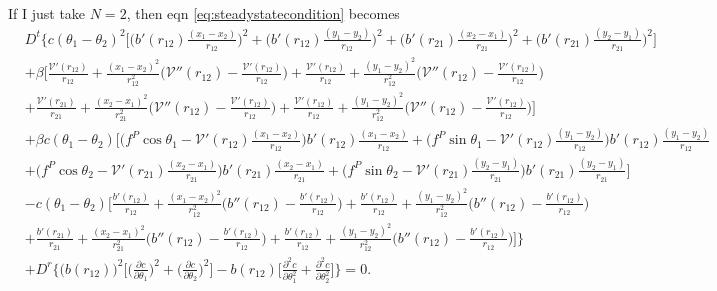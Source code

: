 \documentclass{article}
\begin{document}
If I just take $N=2$, then eqn \ref{eq:steadystatecondition} becomes
\begin{align}
  &D^t\bigg\{c(\theta_1-\theta_2)^2\bigg[\bigg(b'(r_{12})\frac{(x_1-x_2)}{r_{12}}\bigg)^2
    +\bigg(b'(r_{12})\frac{(y_1-y_2)}{r_{12}}\bigg)^2
    +\bigg(b'(r_{21})\frac{(x_2-x_1)}{r_{21}}\bigg)^2
    +\bigg(b'(r_{21})\frac{(y_2-y_1)}{r_{21}}\bigg)^2\bigg]\nonumber\\
  &+\beta\bigg[\frac{\mathcal{V}'(r_{12})}{r_{12}}
    +\frac{(x_1-x_2)^2}{r_{12}^2}\bigg(\mathcal{V}''(r_{12})
    -\frac{\mathcal{V}'(r_{12})}{r_{12}}\bigg)
    +\frac{\mathcal{V}'(r_{12})}{r_{12}}
    +\frac{(y_1-y_2)^2}{r_{12}^2}\bigg(\mathcal{V}''(r_{12})
    -\frac{\mathcal{V}'(r_{12})}{r_{12}}\bigg)\nonumber\\
  &+\frac{\mathcal{V}'(r_{21})}{r_{21}}
    +\frac{(x_2-x_1)^2}{r_{21}^2}\bigg(\mathcal{V}''(r_{12})
    -\frac{\mathcal{V}'(r_{12})}{r_{12}}\bigg)
    +\frac{\mathcal{V}'(r_{12})}{r_{12}}
    +\frac{(y_1-y_2)^2}{r_{12}^2}\bigg(\mathcal{V}''(r_{12})
    -\frac{\mathcal{V}'(r_{12})}{r_{12}}\bigg)\bigg]\nonumber\\
  &+\beta c(\theta_1-\theta_2)\bigg[
    \bigg(f^P\cos\theta_1-\mathcal{V}'(r_{12})\frac{(x_1-x_2)}{r_{12}}\bigg)
    b'(r_{12})\frac{(x_1-x_2)}{r_{12}}
    +\bigg(f^P\sin\theta_1-\mathcal{V}'(r_{12})\frac{(y_1-y_2)}{r_{12}}\bigg)
    b'(r_{12})\frac{(y_1-y_2)}{r_{12}}\nonumber\\
  &+\bigg(f^P\cos\theta_2-\mathcal{V}'(r_{21})\frac{(x_2-x_1)}{r_{21}}\bigg)
    b'(r_{21})\frac{(x_2-x_1)}{r_{21}}
    +\bigg(f^P\sin\theta_2-\mathcal{V}'(r_{21})\frac{(y_2-y_1)}{r_{21}}\bigg)
    b'(r_{21})\frac{(y_2-y_1)}{r_{21}}\bigg]\nonumber\\
  &-c(\theta_1-\theta_2)\bigg[\frac{b'(r_{12})}{r_{12}}
    +\frac{(x_1-x_2)^2}{r_{12}^2}\bigg(b''(r_{12})
    -\frac{b'(r_{12})}{r_{12}}\bigg)
    +\frac{b'(r_{12})}{r_{12}}
    +\frac{(y_1-y_2)^2}{r_{12}^2}\bigg(b''(r_{12})
    -\frac{b'(r_{12})}{r_{12}}\bigg)\nonumber\\
  &+\frac{b'(r_{21})}{r_{21}}
    +\frac{(x_2-x_1)^2}{r_{21}^2}\bigg(b''(r_{12})
    -\frac{b'(r_{12})}{r_{12}}\bigg)
    +\frac{b'(r_{12})}{r_{12}}
    +\frac{(y_1-y_2)^2}{r_{12}^2}\bigg(b''(r_{12})
    -\frac{b'(r_{12})}{r_{12}}\bigg)\bigg]\bigg\}\nonumber\\
  &+D^r\bigg\{\big(b(r_{12})\big)^2\bigg[\bigg(\frac{\partial c}{\partial \theta_1}\bigg)^2
    +\bigg(\frac{\partial c}{\partial \theta_2}\bigg)^2\bigg]
    -b(r_{12})\bigg[\frac{\partial^2 c}{\partial \theta_1^2}
    +\frac{\partial^2 c}{\partial \theta_2^2}\bigg]\bigg\}=0.
\end{align}
\end{document}
